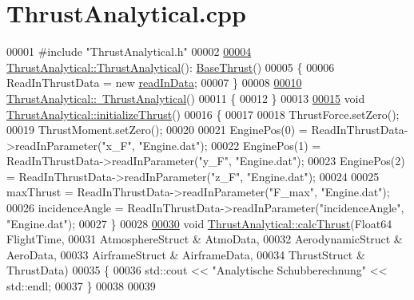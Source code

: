 \hypertarget{_thrust_analytical_8cpp_source}{}\section{Thrust\+Analytical.\+cpp}
\label{_thrust_analytical_8cpp_source}

\begin{DoxyCode}
00001 \textcolor{preprocessor}{#include "ThrustAnalytical.h"}
00002 
\hyperlink{group___engine_a5c75949a22871e861090560adb2d5f18}{00004} \hyperlink{group___engine_a5c75949a22871e861090560adb2d5f18}{ThrustAnalytical::ThrustAnalytical}():
      \hyperlink{group___engine_class_base_thrust}{BaseThrust}()
00005 \{
00006     ReadInThrustData = \textcolor{keyword}{new} \hyperlink{classread_in_data}{readInData};
00007 \}
00008 
\hyperlink{group___engine_aeaf9dd69c10812c673d6cfae0d7ca4fd}{00010} \hyperlink{group___engine_aeaf9dd69c10812c673d6cfae0d7ca4fd}{ThrustAnalytical::~ThrustAnalytical}()
00011 \{
00012 \}
00013 
\hyperlink{group___engine_a5c1db29b00aa92e9f22806b0ea482e05}{00015} \textcolor{keywordtype}{void} \hyperlink{group___engine_a5c1db29b00aa92e9f22806b0ea482e05}{ThrustAnalytical::initializeThrust}()
00016 \{
00017     
00018     ThrustForce.setZero();
00019     ThrustMoment.setZero();
00020 
00021     EnginePos(0) = ReadInThrustData->readInParameter(\textcolor{stringliteral}{"x\_F"}, \textcolor{stringliteral}{"Engine.dat"});
00022     EnginePos(1) = ReadInThrustData->readInParameter(\textcolor{stringliteral}{"y\_F"}, \textcolor{stringliteral}{"Engine.dat"});
00023     EnginePos(2) = ReadInThrustData->readInParameter(\textcolor{stringliteral}{"z\_F"}, \textcolor{stringliteral}{"Engine.dat"});
00024 
00025     maxThrust = ReadInThrustData->readInParameter(\textcolor{stringliteral}{"F\_max"}, \textcolor{stringliteral}{"Engine.dat"});
00026     incidenceAngle = ReadInThrustData->readInParameter(\textcolor{stringliteral}{"incidenceAngle"}, \textcolor{stringliteral}{"Engine.dat"});
00027 \}
00028 
\hyperlink{group___engine_a521b775b57dc2324f09496efb8b12452}{00030} \textcolor{keywordtype}{void} \hyperlink{group___engine_a521b775b57dc2324f09496efb8b12452}{ThrustAnalytical::calcThrust}(Float64 FlightTime,
00031                                   AtmosphereStruct & AtmoData,
00032                                   AerodynamicStruct & AeroData,
00033                                   AirframeStruct & AirframeData,
00034                                   ThrustStruct & ThrustData)
00035 \{
00036     std::cout << \textcolor{stringliteral}{"Analytische Schubberechnung"} << std::endl;
00037 \}
00038 
00039 
\end{DoxyCode}
